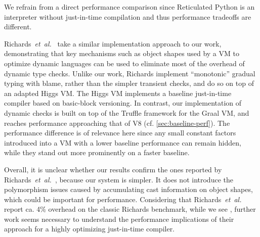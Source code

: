 %
%
We refrain from a direct performance comparison since
Reticulated Python is an interpreter without just-in-time compilation
and thus performance tradeoffs are different.

Richards~\textit{et~al.}~\cite{Richards2017} take a similar implementation
approach to our work, demonstrating that key mechanisms such as object shapes
used by a VM to optimize dynamic languages can be used to eliminate most of
the overhead of dynamic type checks.
Unlike our work, Richards
implement ``monotonic'' gradual typing with blame, rather than
the simpler transient checks, and do so on top of an adapted Higgs
VM.
The Higgs VM implements a baseline just-in-time compiler based on
basic-block versioning\citep{Chevalier-Boisvert:2016:ITS}.
In contrast, our implementation of dynamic checks
is built on top of the Truffle framework for the Graal VM, and reaches
performance approaching that of V8 (cf. \cref{sec:baseline-perf}).
The performance difference is of relevance here since any small constant factors
introduced into a VM with a lower baseline performance can remain hidden,
while they stand out more prominently on a faster baseline.

Overall, it is unclear whether our results confirm the ones
reported by Richards~\textit{et~al.}~\cite{Richards2017},
because our system is simpler.
It does not introduce the polymorphism
issues caused by accumulating cast information on object shapes,
which could be important for performance.
Considering that Richards~\textit{et~al.} report ca. 4\% overhead
on the classic Richards benchmark, while we see \OverheadRichardsP,
further work seems necessary to understand the performance implications of
their approach for a highly optimizing just-in-time compiler.

